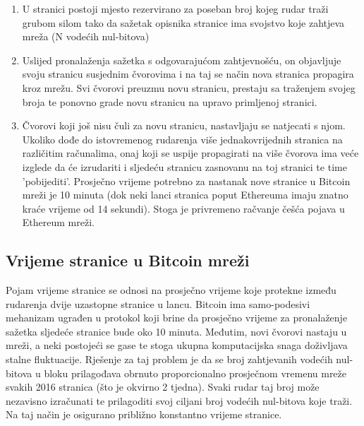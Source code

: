 \documentclass[utf8, zavrsni]{fer}
\begin{document}
\begin{enumerate}
	\item U stranici postoji mjesto rezervirano za poseban broj kojeg rudar traži grubom silom tako da sažetak opisnika stranice ima svojstvo koje zahtjeva mreža (N vodećih nul-bitova)\footnotemark
	\item Uslijed pronalaženja sažetka s odgovarajućom zahtjevnošću, on objavljuje svoju stranicu susjednim čvorovima i na taj se način nova stranica propagira kroz mrežu. Svi čvorovi preuzmu novu stranicu, prestaju sa traženjem svojeg broja te ponovno grade novu stranicu na upravo primljenoj stranici.
	\item Čvorovi koji još nisu čuli za novu stranicu, nastavljaju se natjecati s njom. Ukoliko dođe do istovremenog rudarenja više jednakovrijednih stranica na različitim računalima, onaj koji se uspije propagirati na više čvorova ima veće izglede da će izrudariti i sljedeću stranicu zasnovanu na toj stranici te time 'pobijediti'\footnotemark \footnotemark. Prosječno vrijeme potrebno za nastanak nove stranice u Bitcoin mreži je 10 minuta (dok neki lanci stranica poput Ethereuma imaju znatno kraće vrijeme od 14 sekundi). Stoga je privremeno račvanje češća pojava u Ethereum mreži.
\end{enumerate}

\subsection{Vrijeme stranice u Bitcoin mreži}
Pojam vrijeme stranice se odnosi na prosječno vrijeme koje protekne između rudarenja dvije uzastopne stranice u lancu. Bitcoin ima samo-podesivi mehanizam ugrađen u protokol koji brine da prosječno vrijeme za pronalaženje sažetka sljedeće stranice bude oko 10 minuta. Međutim, novi čvorovi nastaju u mreži, a neki postojeći se gase te stoga ukupna komputacijska snaga doživljava stalne fluktuacije. Rješenje za taj problem je da se broj zahtjevanih vodećih nul-bitova u bloku prilagođava obrnuto proporcionalno prosječnom vremenu mreže svakih 2016 stranica (što je okvirno 2 tjedna). Svaki rudar taj broj može nezavisno izračunati te prilagoditi svoj ciljani broj vodećih nul-bitova koje traži. Na taj način je osigurano približno konstantno vrijeme stranice.
\end{document}
